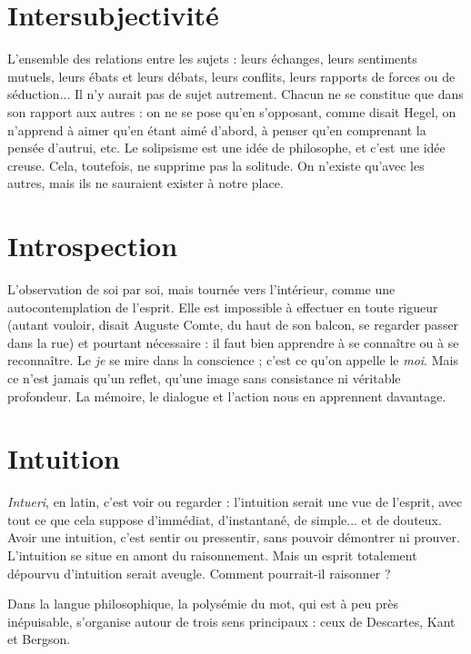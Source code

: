 {%
\section{Intersubjectivité}
L'ensemble des relations entre les sujets : leurs
échanges, leurs sentiments mutuels, leurs ébats et
leurs débats, leurs conflits, leurs rapports de forces ou de séduction... Il n’y
aurait pas de sujet autrement. Chacun ne se constitue que dans son rapport aux
autres : on ne se pose qu’en s’opposant, comme disait Hegel, on n’apprend à
aimer qu’en étant aimé d’abord, à penser qu’en comprenant la pensée d'autrui,
etc. Le solipsisme est une idée de philosophe, et c’est une idée creuse. Cela, toutefois,
ne supprime pas la solitude. On n'existe qu’avec les autres, mais ils ne
sauraient exister à notre place.

\section{Introspection}
L'observation de soi par soi, mais tournée vers l’intérieur,
comme une autocontemplation de l'esprit. Elle
est impossible à effectuer en toute rigueur (autant vouloir, disait Auguste
Comte, du haut de son balcon, se regarder passer dans la rue) et pourtant
nécessaire : il faut bien apprendre à se connaître ou à se reconnaître. Le {\it je} se
mire dans la conscience ; c’est ce qu’on appelle le {\it moi}. Mais ce n’est jamais
qu’un reflet, qu'une image sans consistance ni véritable profondeur. La
mémoire, le dialogue et l’action nous en apprennent davantage.

\section{Intuition}
{\it Intueri}, en latin, c’est voir ou regarder : l’intuition serait une
vue de l'esprit, avec tout ce que cela suppose d’immédiat,
d’instantané, de simple... et de douteux. Avoir une intuition, c’est sentir ou
pressentir, sans pouvoir démontrer ni prouver. L’intuition se situe en amont du
raisonnement. Mais un esprit totalement dépourvu d’intuition serait aveugle.
Comment pourrait-il raisonner ?

Dans la langue philosophique, la polysémie du mot, qui est à peu près inépuisable,
s'organise autour de trois sens principaux : ceux de Descartes, Kant et
Bergson.

}

